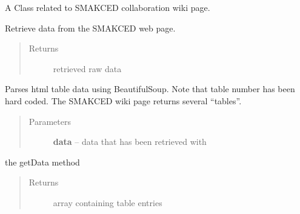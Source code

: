 \documentclass[letterpaper,10pt,english]{sphinxmanual}
\begin{document}
\begin{fulllineitems}
\label{SamPy.smakced:SamPy.smakced.getSmackedData.Smakced}
A Class related to SMAKCED collaboration wiki page.


\begin{fulllineitems}
\label{SamPy.smakced:SamPy.smakced.getSmackedData.Smakced.getData}
Retrieve data from the SMAKCED web page.
\begin{quote}\begin{description}
\item[{Returns}] \leavevmode
retrieved raw data

\end{description}\end{quote}

\end{fulllineitems}



\begin{fulllineitems}
\label{SamPy.smakced:SamPy.smakced.getSmackedData.Smakced.parseTable}
Parses html table data using BeautifulSoup.
Note that table number has been hard coded.
The SMAKCED wiki page returns several ``tables''.
\begin{quote}\begin{description}
\item[{Parameters}] \leavevmode
\textbf{data} -- data that has been retrieved with

\end{description}\end{quote}

the getData method
\begin{quote}\begin{description}
\item[{Returns}] \leavevmode
array containing table entries

\end{description}\end{quote}

\end{fulllineitems}




\end{fulllineitems}
\end{document}
